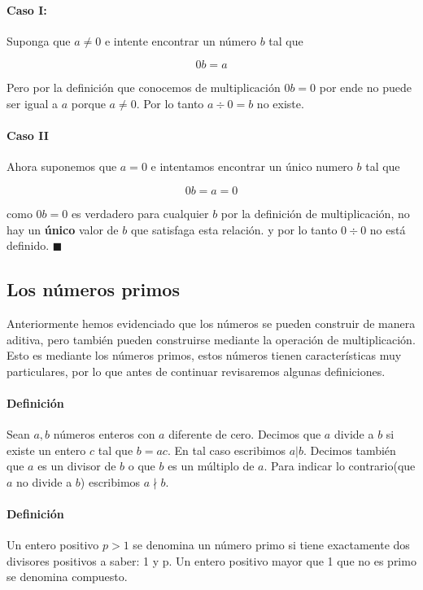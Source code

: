 \documentclass{article}
\begin{document}
\paragraph{Caso I:} Suponga que $a \neq 0$ e intente encontrar un número $b$ tal que

$$0b = a$$

Pero por la definición que conocemos de multiplicación $0b = 0$ por ende no puede ser igual a $a$ porque $a \neq 0$. Por lo tanto $a \div 0 = b$ no existe.

\paragraph{Caso II} Ahora suponemos que $a = 0$ e intentamos encontrar un único numero $b$ tal que 

$$0b = a = 0$$

como $0b = 0$ es verdadero para cualquier $b$ por la definición de multiplicación, no hay un \textbf{único} valor de $b$ que satisfaga esta relación. y por lo tanto $0 \div 0$ no está definido. $\blacksquare$

\subsection{Los números primos} Anteriormente hemos evidenciado que los números se pueden construir de manera aditiva, pero también pueden construirse mediante la operación de multiplicación. Esto es mediante los números primos, estos números tienen características muy particulares, por lo que antes de continuar revisaremos algunas definiciones.

\paragraph{Definición} Sean $a,b$ números enteros con $a$ diferente de cero. Decimos que $a$ divide a $b$ si existe un entero $c$ tal que $b=ac$. En tal caso escribimos $a|b$. Decimos también que $a$ es un divisor de $b$ o que $b$ es un múltiplo de $a$. Para indicar lo contrario(que $a$ no divide a $b$) escribimos $a \nmid b$.

\paragraph{Definición} Un entero positivo $p > 1$ se denomina un número primo si tiene exactamente dos divisores positivos a saber: 1 y p. Un entero positivo mayor que 1 que no es primo se denomina compuesto.
\end{document}

